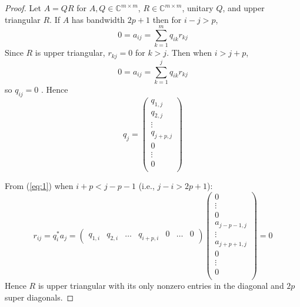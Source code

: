 \documentclass{article}
\numberwithin{pic}{section}
\numberwithin{lem}{section}
\numberwithin{thm}{section}
\numberwithin{cor}{section}
\theoremstyle{definition}
\numberwithin{ex}{section}
\numberwithin{defn}{section}
\theoremstyle{definition}
\theoremstyle{remark}
\newcommand{\C}{\ensuremath{\mathbb{C}}} %
\begin{document}
\begin{proof}
  
Let $A = QR$ for $A,Q \in \C^{m \times m}$, $R \in \C^{m \times m}$, unitary $Q$, and upper triangular $R$. If $A$ has bandwidth $2p +1$ then for $i - j > p$, 
	$$ 0 = a_{ij} = \sum_{k = 1}^{m} q_{ik}r_{kj}$$
Since $R$ is upper triangular, $r_{kj} = 0$ for $k > j$. Then when $i > j + p$,
	$$ 0 = a_{ij} = \sum_{k = 1}^{j} q_{ik}r_{kj}$$
so $q_{ij} = 0$ . Hence 
	\begin{equation} \label{eq:1}
		q_{j} = \begin{pmatrix} 
			q_{1,j} \\
			q_{2,j} \\
			\vdots \\
			q_{j+p,j} \\
			0 \\
			\vdots \\
			0 \\
		\end{pmatrix}
	\end{equation}

From (\ref{eq:1}) when $i+p < j - p -1$ (i.e., $j - i > 2p + 1$):
	$$
		r_{ij} = q_i^* a_j =\begin{pmatrix}
			q_{1,i} & q_{2,i} &	\dots & q_{i+p,i} & 0 & \dots &	0 
		\end{pmatrix}\begin{pmatrix} 
		0 \\
		\vdots \\
		0 \\
		a_{j-p-1,j} \\
		\vdots \\
		a_{j+p+1,j} \\
		0 \\
		\vdots \\
		0 \\
		\end{pmatrix} = 0
	$$
Hence $R$ is upper triangular with its only nonzero entries in the diagonal and $2p$ super diagonals.
\end{proof}
\end{document}
